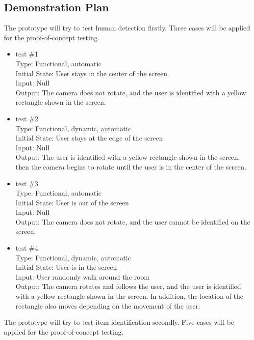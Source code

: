 \documentclass[12pt, titlepage]{article}
\begin{document}
\subsection{Demonstration Plan}
The prototype will try to test human detection firstly. Three cases will be applied for the proof-of-concept testing.
\begin{itemize}
\item{test \#1\\}
Type: Functional, automatic\\
Initial State: User stays in the center of the screen\\
Input: Null\\
Output: The camera does not rotate, and the user is identified with a yellow rectangle shown in the screen.\\			
\item{test \#2\\}
Type: Functional, dynamic, automatic\\
Initial State: User stays at the edge of the screen\\
Input: Null\\
Output: The user is identified with a yellow rectangle shown in the screen, then the camera begins to rotate until the user is in the center of the screen.\\
\item{test \#3\\}
Type: Functional, automatic\\
Initial State: User is out of the screen\\
Input: Null\\
Output: The camera does not rotate, and the user cannot be identified on the screen.\\
\item{test \#4\\}
Type: Functional, dynamic, automatic\\
Initial State: User is in the screen\\
Input: User randomly walk around the room\\
Output: The camera rotates and follows the user, and the user is identified with a yellow rectangle shown in the screen. In addition, the location of the rectangle also moves depending on the movement of the user.\\
\end{itemize}
The prototype will try to test item identification secondly. Five cases will be applied for the proof-of-concept testing.
\end{document}
